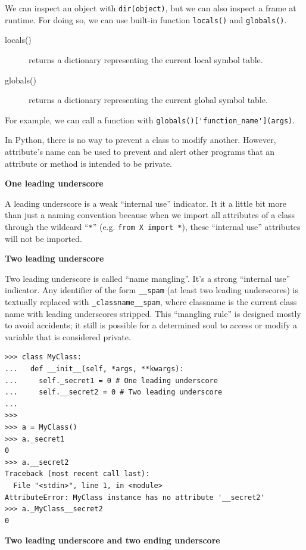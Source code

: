 \documentclass[a4paper,10pt]{article}
\begin{document}
We can inspect an object with \lstinline|dir(object)|, but we can also inspect a frame at runtime. For doing so, we can use built-in function \lstinline|locals()| and \lstinline|globals()|.

\begin{description}
\item[locals()] returns a dictionary representing the current local symbol table.
\item[globals()] returns a dictionary representing the current global symbol table.
\end{description}

For example, we can call a function with \lstinline|globals()['function_name'](args)|.

In Python, there is no way to prevent a class to modify another. However, attribute's name can be used to prevent and alert other programs that an attribute or method is intended to be private.

\textbf{One leading underscore}

A leading underscore is a weak ``internal use'' indicator. It it a little bit more than just a naming convention because when we import all attributes of a class through the wildcard ``\lstinline|*|'' (e.g. \lstinline|from X import *|), these ``internal use'' attributes will not be imported.

\textbf{Two leading underscore}

Two leading underscore is called ``name mangling''. It’s a strong “internal use” indicator. Any identifier of the form \lstinline|__spam| (at least two leading underscores) is textually replaced with \lstinline|_classname__spam|, where classname is the current class name with leading underscores stripped. This “mangling rule” is designed mostly to avoid accidents; it still is possible for a determined soul to access or modify a variable that is considered private.

\begin{lstlisting}
>>> class MyClass:
...   def __init__(self, *args, **kwargs):
...     self._secret1 = 0 # One leading underscore
...     self.__secret2 = 0 # Two leading underscore
...
>>>
>>> a = MyClass()
>>> a._secret1
0
>>> a.__secret2
Traceback (most recent call last):
  File "<stdin>", line 1, in <module>
AttributeError: MyClass instance has no attribute '__secret2'
>>> a._MyClass__secret2
0
\end{lstlisting}

\textbf{Two leading underscore and two ending underscore}
\end{document}

